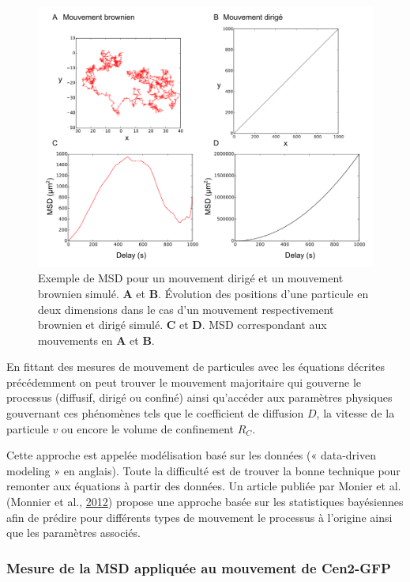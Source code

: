 \documentclass[12pt,a4paper,twoside,openright]{book}
\begin{document}
\begin{figure}[htbp]
\centering
\includegraphics{figures/results/imaging/motions.png}
\caption[Exemple de MSD pour un mouvement dirigé et un mouvement brownien simulé]{\label{fig:motions}Exemple
de MSD pour un mouvement dirigé et un mouvement brownien simulé.
\textbf{A} et \textbf{B}. Évolution des positions d'une particule en
deux dimensions dans le cas d'un mouvement respectivement brownien et
dirigé simulé. \textbf{C} et \textbf{D}. MSD correspondant aux
mouvements en \textbf{A} et \textbf{B}.}
\end{figure}

En fittant des mesures de mouvement de particules avec les équations
décrites précédemment on peut trouver le mouvement majoritaire qui
gouverne le processus (diffusif, dirigé ou confiné) ainsi qu'accéder aux
paramètres physiques gouvernant ces phénomènes tels que le coefficient
de diffusion \(D\), la vitesse de la particule \(v\) ou encore le volume
de confinement \(R_C\).

Cette approche est appelée modélisation basé sur les données («
data-driven modeling » en anglais). Toute la difficulté est de trouver
la bonne technique pour remonter aux équations à partir des données. Un
article publiée par Monier et al. (Monnier et al.,
\hyperref[ref-Monnier2012]{2012}) propose une approche basée sur les
statistiques bayésiennes afin de prédire pour différents types de
mouvement le processus à l'origine ainsi que les paramètres associés.

\subsubsection{Mesure de la MSD appliquée au mouvement de
Cen2-GFP}\label{mesure-de-la-msd-appliquuxe9e-au-mouvement-de-cen2-gfp}
\end{document}
